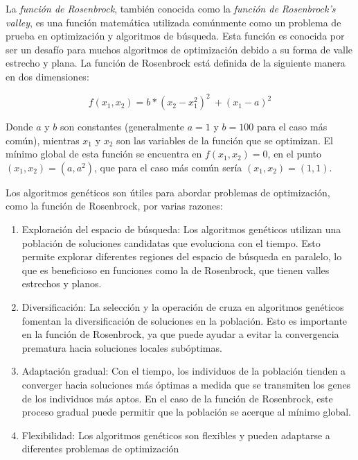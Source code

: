 La \textit{función de Rosenbrock}, también conocida como la \textit{función de Rosenbrock's valley}, es una función matemática utilizada comúnmente como un problema de prueba en optimización y algoritmos de búsqueda. Esta función es conocida por ser un desafío para muchos algoritmos de optimización debido a su forma de valle estrecho y plana. La función de Rosenbrock está definida de la siguiente manera en dos dimensiones:

$$f(x_1, x_2) = b * (x_2 - x_1^2)^2\ + (x_1 - a)^2$$

Donde $a$ y $b$ son constantes (generalmente $a = 1$ y $b = 100$ para el caso más común), mientras $x_1$ y $x_2$ son las variables de la función que se optimizan. El mínimo global de esta función se encuentra en $f(x_1, x_2) = 0$, en el punto $(x_1, x_2) = (a, a^2)$, que para el caso más común sería $(x_1, x_2) = (1, 1)$.

Los algoritmos genéticos son útiles para abordar problemas de optimización, como la función de Rosenbrock, por varias razones:

\begin{enumerate}
	\item Exploración del espacio de búsqueda: Los algoritmos genéticos utilizan una población de soluciones candidatas que evoluciona con el tiempo. Esto permite explorar diferentes regiones del espacio de búsqueda en paralelo, lo que es beneficioso en funciones como la de Rosenbrock, que tienen valles estrechos y planos.
	\item Diversificación: La selección y la operación de cruza en algoritmos genéticos fomentan la diversificación de soluciones en la población. Esto es importante en la función de Rosenbrock, ya que puede ayudar a evitar la convergencia prematura hacia soluciones locales subóptimas.
	\item Adaptación gradual: Con el tiempo, los individuos de la población tienden a converger hacia soluciones más óptimas a medida que se transmiten los genes de los individuos más aptos. En el caso de la función de Rosenbrock, este proceso gradual puede permitir que la población se acerque al mínimo global.
	\item Flexibilidad: Los algoritmos genéticos son flexibles y pueden adaptarse a diferentes problemas de optimización
\end{enumerate}
